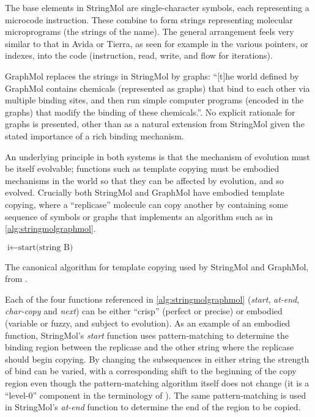 The base elements in StringMol are single-character symbols, each representing a microcode instruction. These combine to form strings representing molecular microprograms (the strings of the name). The general arrangement feels very similar to that in Avida or Tierra, as seen for example in the various pointers, or indexes, into the code (instruction, read, write, and flow for iterations).

GraphMol replaces the strings in StringMol by graphs: ``[t]he world defined by GraphMol contains chemicals (represented as graphs) that bind to each other via multiple binding sites, and then run simple computer programs (encoded in the graphs) that modify the binding of these chemicals.''. No explicit rationale for graphs is presented, other than as a natural extension from StringMol given the stated importance of a rich binding mechanism. 

An underlying principle in both systems is that the mechanism of evolution must be itself evolvable; functions such as template copying must be embodied mechanisms in the world so that they can be affected by evolution, and so evolved.  Crucially both StringMol and GraphMol have embodied template copying, where a ``replicase'' molecule can copy another by containing some sequence of symbols or graphs that implements an algorithm such as in \cref{alg:stringmolgraphmol}.

\begin{algorithm}[ht]
	$\text{i} \leftarrow \text{start(string B)}$\;
	\caption[The canonical algorithm for template copying used by StringMol and GraphMol]{The canonical algorithm for template copying used by StringMol and GraphMol, from \textcite{Nellis2014}.}
	\label{alg:stringmolgraphmol}
\end{algorithm}

Each of the four functions referenced in \cref{alg:stringmolgraphmol} (\emph{start}, \emph{at-end}, \emph{char-copy} and \emph{next}) can be either ``crisp'' (\ie perfect or precise) or embodied (variable or fuzzy, and subject to evolution). As an example of an embodied function, StringMol's \emph{start} function uses pattern-matching to determine the binding region between the replicase and the other string where the replicase should begin copying. By changing the subsequences in either string the strength of bind can be varied, with a corresponding shift to the beginning of the copy region even though the pattern-matching algorithm itself does not change (it is a ``level-0'' component in the terminology of \textcite{BanzhafBaumgaertnerBeslonEtAl2016}). The same pattern-matching is used in StringMol's \emph{at-end} function to determine the end of the region to be copied.

